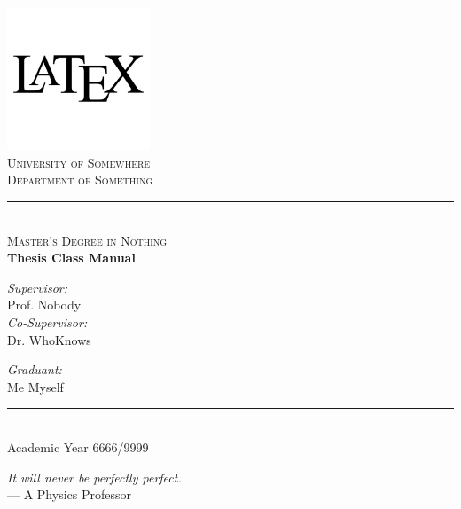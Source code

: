 \documentclass[12pt,a4papertwoside,openright,cleardoublepage=empty]{article}
\newcommand\blankpage{%
     \null
     \thispagestyle{empty}%
     \newpage}
\begin{document}
    \pagestyle{empty}
    \centering
    \includegraphics[width=0.32\textwidth]{latex.png}\\
    \vspace{0.5cm}
    {\scshape\Large University of Somewhere \\}
    \vspace{0.1cm}
    \vspace{0.1cm}
    {\scshape\large Department of Something\\}
    \rule{\linewidth}{0.9pt}\\
    \vspace{0.1cm}
    {\scshape\large Master's Degree in Nothing\\}
    \vfill
    {\Huge\bfseries Thesis Class Manual \\}
    \vfill
    
    \begin{minipage}[t]{6cm}
        \flushleft
        {\Large \textit{Supervisor:}} \\
        \vspace{0.1cm}
        {\Large Prof. Nobody}\\
        \vspace{0.3cm}
        {\Large \textit{Co-Supervisor:}} \\
        \vspace{0.1cm}
        {\Large Dr. WhoKnows}\\
    \end{minipage}
    \hfill
    \begin{minipage}[t]{5cm}
        \flushright
        {\Large \textit{Graduant:}} \\
        \vspace{0.1cm}
        {\Large Me Myself} \\
    \end{minipage}
    
    \vspace{1.1cm}
    \rule{\linewidth}{0.8pt}\\
    \vspace{0.4cm}
    \centering
    {\large Academic Year 6666/9999}

    \afterpage{\blankpage}
    \newpage

    \vspace*{4cm}

    \centering
    \emph{It will never be perfectly perfect.} \\
    \medskip
    --- A Physics Professor   
\end{document}
